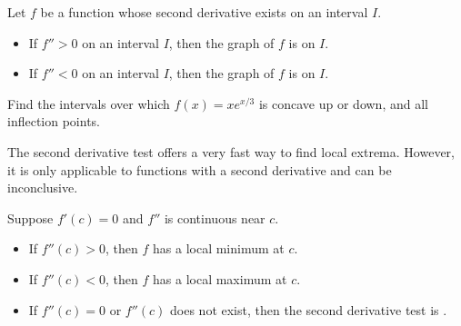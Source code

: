 \documentclass[../main.tex]{subfiles}
\begin{document}
\begin{thm} \label{thm:concavity-test}
  Let \(f\) be a function whose second derivative exists on an interval \(I\).
  \begin{itemize}
    \item If \(f'' > 0\) on an interval \(I\), then the graph of \(f\) is  on \(I\).
    \item If \(f'' < 0\) on an interval \(I\), then the graph of \(f\) is  on \(I\).
  \end{itemize}

\end{thm}

\begin{example}  \label{eg:shape-3}
  Find the intervals over which \(f(x) = x e^{x/3}\) is concave up or down, and all inflection points.

\end{example}

\clearpage

The second derivative test offers a very fast way to find local extrema. However, it is only applicable to functions with a second derivative and can be inconclusive.

\begin{thm} \label{thm:second-derivative-test}
  Suppose \(f'(c) = 0\) and \(f''\) is continuous near \(c\).

  \begin{sidefigure}[0.25]{}
    \begin{itemize}
      \item If \(f''(c) > 0\), then \(f\) has a local minimum at \(c\).
      \item If \(f''(c) < 0\), then \(f\) has a local maximum at \(c\).
      \item[\faExclamationTriangle{}] If \(f''(c) = 0\) or \(f''(c)\) does not exist, then the second derivative test is .
    \end{itemize}
  \end{sidefigure}

\end{thm}
\end{document}
